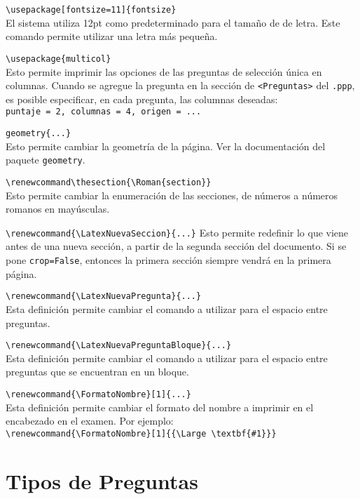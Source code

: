 \documentclass[12pt]{article}
\theoremstyle{definition}
\begin{document}
\noindent \verb|\usepackage[fontsize=11]{fontsize}| \\
El sistema utiliza 12pt como predeterminado para el tama\~no de de letra. Este comando permite utilizar una letra m\'as peque\~na.
\medskip

\noindent \verb|\usepackage{multicol}| \\
Esto permite imprimir las opciones de las preguntas de selecci\'on \'unica en columnas. Cuando se agregue la pregunta en la secci\'on de \verb|<Preguntas>| del \verb|.ppp|, es posible especificar, en cada pregunta, las columnas deseadas: \\
\verb|puntaje = 2, columnas = 4, origen = ...|
\medskip

\noindent \verb|geometry{...}| \\
  Esto permite cambiar la geometr\'ia de la p\'agina. Ver la documentaci\'on del paquete \verb|geometry|.
\medskip

\noindent \verb|\renewcommand\thesection{\Roman{section}}| \\
  Esto permite cambiar la enumeraci\'on de las secciones, de n\'umeros a n\'umeros romanos en may\'usculas.

\noindent \verb|\renewcommand{\LatexNuevaSeccion}{...}|
  Esto permite redefinir lo que viene antes de una nueva secci\'on, a partir de la segunda secci\'on del documento. Si se pone \verb|crop=False|, entonces la primera secci\'on siempre vendr\'a en la primera p\'agina.

\noindent \verb|\renewcommand{\LatexNuevaPregunta}{...}| \\
Esta definici\'on permite cambiar el comando a utilizar para el espacio entre preguntas.
\medskip

\noindent \verb|\renewcommand{\LatexNuevaPreguntaBloque}{...}| \\
Esta definici\'on permite cambiar el comando a utilizar para el espacio entre preguntas que se encuentran en un bloque.
\medskip

\noindent \verb|\renewcommand{\FormatoNombre}[1]{...}| \\
Esta definici\'on permite cambiar el formato del nombre a imprimir en el encabezado en el examen. Por ejemplo: \\
\verb|\renewcommand{\FormatoNombre}[1]{{\Large \textbf{#1}}}|
\medskip


\section{Tipos de Preguntas}
\end{document}
